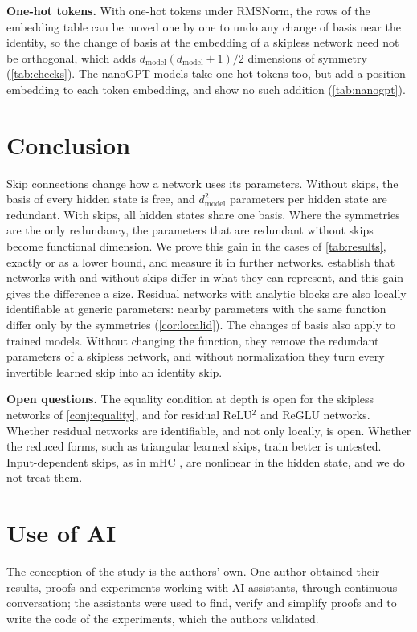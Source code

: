 \documentclass[10pt]{article}
\theoremstyle{definition}
\theoremstyle{remark}
\newcommand{\dm}{d_{\mathrm{model}}}
\newcommand{\para}[1]{\smallskip\noindent\textbf{#1}\hspace{0.5em}}
\begin{document}
\para{One-hot tokens.} With one-hot tokens under RMSNorm, the rows of the embedding table can be moved one by one to undo any change of basis near the identity, so the change of basis at the embedding of a skipless network need not be orthogonal, which adds $\dm(\dm+1)/2$ dimensions of symmetry (\cref{tab:checks}). The nanoGPT models take one-hot tokens too, but add a position embedding to each token embedding, and show no such addition (\cref{tab:nanogpt}).

\section{Conclusion}\label{sec:outlook}\label{sec:conclusion}

Skip connections change how a network uses its parameters. Without skips, the basis of every hidden state is free, and $\dm^2$ parameters per hidden state are redundant. With skips, all hidden states share one basis. Where the symmetries are the only redundancy, the parameters that are redundant without skips become functional dimension. We prove this gain in the cases of \cref{tab:results}, exactly or as a lower bound, and measure it in further networks. \citet{mijoski2026worth} establish that networks with and without skips differ in what they can represent, and this gain gives the difference a size. Residual networks with analytic blocks are also locally identifiable at generic parameters: nearby parameters with the same function differ only by the symmetries (\cref{cor:localid}). The changes of basis also apply to trained models. Without changing the function, they remove the redundant parameters of a skipless network, and without normalization they turn every invertible learned skip into an identity skip.

\para{Open questions.} The equality condition at depth is open for the skipless networks of \cref{conj:equality}, and for residual ReLU$^2$ and ReGLU networks. Whether residual networks are identifiable, and not only locally, is open. Whether the reduced forms, such as triangular learned skips, train better is untested. Input-dependent skips, as in mHC \citep{xie2025mhc}, are nonlinear in the hidden state, and we do not treat them.

\section*{Use of AI}
The conception of the study is the authors' own. One author obtained their results, proofs and experiments working with AI assistants, through continuous conversation; the assistants were used to find, verify and simplify proofs and to write the code of the experiments, which the authors validated.
\end{document}
